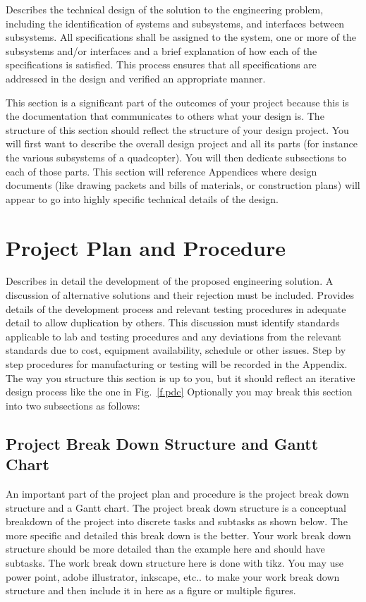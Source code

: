 \documentclass[fleqn,10pt]{project}
\begin{document}
Describes the technical design of the solution to the engineering problem, 
including the identification of systems and subsystems, and interfaces between 
subsystems. All specifications shall be assigned to the system, one or more of 
the subsystems and/or interfaces and a brief explanation of how each of the 
specifications is satisfied. This process ensures that all specifications are 
addressed in the design and verified an appropriate manner. 

This section is a significant part of the outcomes of your project because this is the 
documentation that communicates to others what your design is.  The structure of this section
should reflect the structure of your design project. You will first want to describe
the overall design project and all its parts (for instance the various subsystems of a
quadcopter). You will then dedicate subsections to each of those parts. 
This section will reference Appendices where design documents (like drawing packets and 
bills of materials, or construction plans) will appear to go into highly specific
technical details of the design.  

\section{Project Plan and Procedure}

Describes in detail the development of the proposed engineering solution. A discussion of 
alternative solutions and their rejection must be included. Provides details of the 
development process and relevant testing procedures in adequate detail to 
allow duplication by others. This discussion must identify standards applicable to lab and 
testing procedures and any deviations from the relevant standards due to cost, equipment 
availability, schedule or other issues. Step by step procedures for manufacturing or testing 
will be recorded in the Appendix. The way you structure this section is up to you, but it should reflect an iterative 
design process like the one in Fig.~\ref{f.pdc} Optionally you may break this section into two subsections as follows:

\subsection{Project Break Down Structure and Gantt Chart}

An important part of the project plan and procedure is the project break down structure and
a Gantt chart.  
The project break down structure is a conceptual breakdown of the project into discrete tasks and subtasks as shown below. 
The more specific and detailed this break down is the better.  Your work break down structure should be more detailed
than the example here and should have subtasks. The work break down structure
here is done with tikz.  You may use power point, adobe illustrator, inkscape, etc.. to 
make your work break down structure and then include it in here as a figure or multiple figures.
\end{document}

